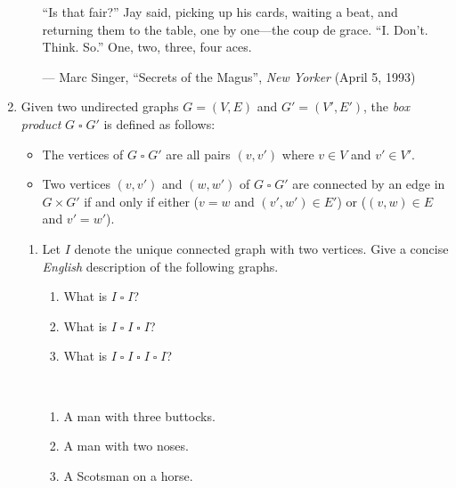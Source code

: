 \documentclass[11pt]{article}
\begin{document}
\begin{enumerate}
\begin{enumerate}
\begin{solution}
“Is that fair?” Jay said, picking up his cards, waiting a beat, and returning them to the table, one by one---the coup de grace. “I. Don’t. Think. So.” One, two, three, four aces.

\begin{flushright}
--- Marc Singer, “Secrets of the Magus”, \emph{New Yorker} (April 5, 1993)
\end{flushright}
\end{solution}

\end{enumerate}

\def\BOX{\mathbin\square}
\newpage
\item
Given two undirected graphs $G = (V,E)$ and $G' = (V',E')$, the \emph{box product} $G\BOX G'$ is defined as follows:
\begin{itemize}
\item 
The vertices of $G\BOX G'$ are all pairs $(v, v')$ where $v\in V$ and $v'\in V'$.
\item
Two vertices $(v,v')$ and $(w,w')$ of $G\BOX G'$ are connected by an edge in $G\times G'$ if and only if either \big($v = w$ and $(v',w')\in E'$\big) or \big($(v,w)\in E$ and $v' = w'$\big).
\end{itemize}

\begin{enumerate}
\item
Let $I$ denote the unique connected graph with two vertices.  Give a concise \emph{English} description of the following graphs.
\begin{enumerate} 
\item What is $I\BOX I$?
\item What is $I\BOX I\BOX I$?
\item What is $I\BOX I\BOX I\BOX I$?
\end{enumerate}
\begin{solution}~
\begin{enumerate} 
\item A man with three buttocks.
\item A man with two noses.
\item {} A Scotsman on a horse.
\end{enumerate}
\vspace{-3.5ex}
\end{solution}


\end{enumerate}
\end{enumerate}
\end{document}
